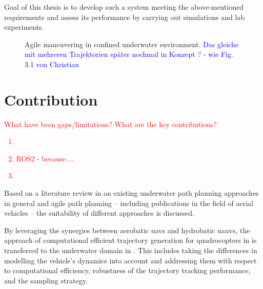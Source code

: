 Goal of this thesis is to develop such a system meeting the above-mentioned requirements and assess its performance by carrying out simulations and lab experiments.

\begin{figure}
    \centering
    
    \caption{Agile maneuvering in confined underwater environment. \textcolor{blue}{Das gleiche mit mehreren Trajektorien später nochmal in Konzept ? - wie Fig. 3.1 von Christian}}
    \label{fig:agile_maneuvering_motivation}
\end{figure}


\section{Contribution}

\textcolor{red}{
What have been gaps/limitations?
%
What are the key contributions?
\begin{enumerate}
    \item 
    \item ROS2 - because....
    \item
\end{enumerate}
}

Based on a literature review in  on existing underwater path planning approaches in general and agile path planning -- including publications in the field of aerial vehicles -- the suitability of different approaches is discussed. 

By leveraging the synergies between aerobatic \acp{uav} and hydrobatic \acp{uauv}, the approach of computational efficient trajectory generation for quadrocopters in \cite{MuellerHehn15} is transferred to the underwater domain in .
This includes taking the differences in modelling the vehicle's dynamics into account and addressing them with respect to computational efficiency, robustness of the trajectory tracking performance, and the sampling strategy.



